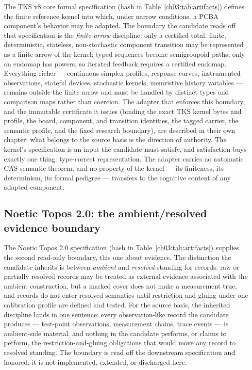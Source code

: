 The TKS v8 core formal specification (hash in
Table~\ref{ch03:tab:artifacts}) defines the finite reference kernel
into which, under narrow conditions, a PCBA component's behavior may be
adapted. The boundary the candidate reads off that specification is the
\emph{finite-arrow} discipline: only a certified total, finite,
deterministic, stateless, non-stochastic component transition may be
represented as a finite arrow of the kernel; typed sequences become
semigroupoid paths; only an endomap has powers, so iterated feedback
requires a certified endomap. Everything richer --- continuous simplex
profiles, response curves, instrumented observations, stateful devices,
stochastic kernels, memristive history variables --- remains outside
the finite arrow and must be handled by distinct types and comparison
maps rather than coercion. The adapter that enforces this boundary, and
the immutable certificate it issues (binding the exact TKS kernel bytes
and profile, the board, component, and transition identities, the
tagged carrier, the semantic profile, and the fixed research boundary),
are described in their own chapter; what belongs to the source basis is
the direction of authority. The kernel's specification is an input the
candidate must satisfy, and satisfaction buys exactly one thing:
type-correct representation. The adapter carries no automatic CAS
semantic theorem, and no property of the kernel --- its finiteness,
its determinism, its formal pedigree --- transfers to the cognitive
content of any adapted component.

\subsection{Noetic Topos 2.0: the ambient/resolved evidence boundary}\label{ch03:boundaries:topos}

The Noetic Topos 2.0 specification (hash in
Table~\ref{ch03:tab:artifacts}) supplies the second read-only boundary,
this one about evidence. The distinction the candidate inherits is
between \emph{ambient} and \emph{resolved} standing for records: raw or
partially resolved records may be treated as external evidence
associated with the ambient construction, but a marked cover does not
make a measurement true, and records do not enter resolved semantics
until restriction and gluing under one calibration profile are defined
and tested. For the source basis, the inherited discipline lands in one
sentence: every observation-like record the candidate produces ---
test-point observations, measurement chains, trace events --- is
ambient-side material, and nothing in the candidate performs, or claims
to perform, the restriction-and-gluing obligations that would move any
record to resolved standing. The boundary is read off the downstream
specification and honored; it is not implemented, extended, or
discharged here.

